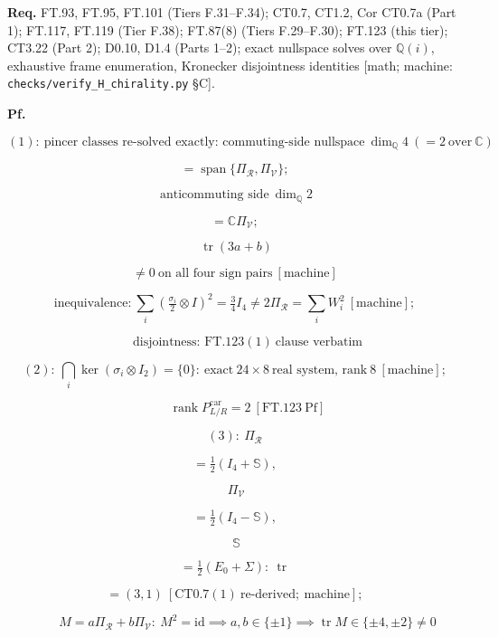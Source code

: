 \documentclass[11pt,openany]{report}
\theoremstyle{canonplain}
\theoremstyle{canondef}
\begin{document}
\textbf{Req.} FT.93, FT.95, FT.101 (Tiers F.31–F.34); CT0.7, CT1.2, Cor CT0.7a (Part 1); FT.117, FT.119 (Tier F.38); FT.87(8) (Tiers F.29–F.30); FT.123 (this tier); CT3.22 (Part 2); D0.10, D1.4 (Parts 1–2); exact nullspace solves over $\mathbb Q(i)$, exhaustive frame enumeration, Kronecker disjointness identities [math; machine: \texttt{checks/\allowbreak{}verify\_\allowbreak{}H\_\allowbreak{}chirality.py} §C].

\textbf{Pf.}

\[
(1):\ \text{pincer classes re-solved exactly: commuting-side nullspace}\ \dim_{\mathbb Q}4\ (=2\ \text{over}\ \mathbb C)
\]

\[
= \operatorname{span}\{\Pi_{\mathcal R},\Pi_{\mathcal V}\};
\]

\[
\ \text{anticommuting side}\ \dim_{\mathbb Q}2
\]

\[
= \mathbb C\Pi_{\mathcal V};
\]

\[
\ \operatorname{tr}(3a+b)
\]

\[
\ne 0\ \text{on all four sign pairs}\ [\text{machine}]
\]

\[
\text{inequivalence:}\ \textstyle\sum_i(\tfrac{\sigma_i}2\otimes I)^2=\tfrac34I_4\ne2\Pi_{\mathcal R}=\sum_iW_i^2\ [\text{machine}];
\]

\[
\qquad \text{disjointness: FT.123}(1)\ \text{clause verbatim}
\]

\[
(2):\ \bigcap_i\ker(\sigma_i\otimes I_2)=\{0\}:\ \text{exact}\ 24\times8\ \text{real system, rank}\ 8\ [\text{machine}];
\]

\[
\qquad \operatorname{rank}P^{\mathrm{car}}_{L/R}=2\ [\mathrm{FT.123}\ \text{Pf}]
\]

\[
(3):\ \Pi_{\mathcal R}
\]

\[
= \tfrac12(I_4+\mathbb S),
\]

\[
\ \Pi_{\mathcal V}
\]

\[
= \tfrac12(I_4-\mathbb S),
\]

\[
\ \mathbb S
\]

\[
= \tfrac12(E_0+\Sigma):\ \operatorname{tr}
\]

\[
= (3,1)\ [\mathrm{CT0.7}(1)\ \text{re-derived};\ \text{machine}];
\]

\[
\qquad M=a\Pi_{\mathcal R}+b\Pi_{\mathcal V}:\ M^2=\mathrm{id}\implies a,b\in\{\pm1\}\implies\operatorname{tr}M\in\{\pm4,\pm2\}\ne0
\]
\end{document}
